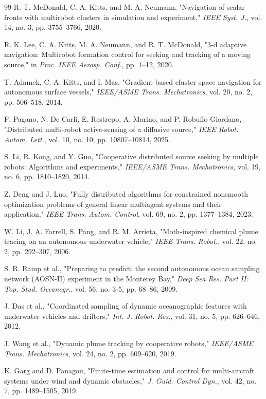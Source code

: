 \documentclass[lettersize,journal]{IEEEtran}
\begin{document}
\begin{thebibliography}{99}
 R. T. McDonald, C. A. Kitts, and M. A. Neumann, "Navigation of scalar fronts with multirobot clusters in simulation and experiment," \textit{IEEE Syst. J.}, vol. 14, no. 3, pp. 3755--3766, 2020.

 R. K. Lee, C. A. Kitts, M. A. Neumann, and R. T. McDonald, "3-d adaptive navigation: Multirobot formation control for seeking and tracking of a moving source," in \textit{Proc. IEEE Aerosp. Conf.}, pp. 1--12, 2020.

 T. Adamek, C. A. Kitts, and I. Mas, "Gradient-based cluster space navigation for autonomous surface vessels," \textit{IEEE/ASME Trans. Mechatronics}, vol. 20, no. 2, pp. 506--518, 2014.

 F. Pagano, N. De Carli, E. Restrepo, A. Marino, and P. Robuffo Giordano, "Distributed multi-robot active-sensing of a diffusive source," \textit{IEEE Robot. Autom. Lett.}, vol. 10, no. 10, pp. 10807--10814, 2025.

 S. Li, R. Kong, and Y. Guo, "Cooperative distributed source seeking by multiple robots: Algorithms and experiments," \textit{IEEE/ASME Trans. Mechatronics}, vol. 19, no. 6, pp. 1810--1820, 2014.

 Z. Deng and J. Luo, "Fully distributed algorithms for constrained nonsmooth optimization problems of general linear multiagent systems and their application," \textit{IEEE Trans. Autom. Control}, vol. 69, no. 2, pp. 1377--1384, 2023.

 W. Li, J. A. Farrell, S. Pang, and R. M. Arrieta, "Moth-inspired chemical plume tracing on an autonomous underwater vehicle," \textit{IEEE Trans. Robot.}, vol. 22, no. 2, pp. 292--307, 2006.

 S. R. Ramp et al., "Preparing to predict: the second autonomous ocean sampling network (AOSN-II) experiment in the Monterey Bay," \textit{Deep Sea Res. Part II: Top. Stud. Oceanogr.}, vol. 56, no. 3-5, pp. 68--86, 2009.

 J. Das et al., "Coordinated sampling of dynamic oceanographic features with underwater vehicles and drifters," \textit{Int. J. Robot. Res.}, vol. 31, no. 5, pp. 626--646, 2012.

 J. Wang et al., "Dynamic plume tracking by cooperative robots," \textit{IEEE/ASME Trans. Mechatronics}, vol. 24, no. 2, pp. 609--620, 2019.

 K. Garg and D. Panagou, "Finite-time estimation and control for multi-aircraft systems under wind and dynamic obstacles," \textit{J. Guid. Control Dyn.}, vol. 42, no. 7, pp. 1489--1505, 2019.


\end{thebibliography}
\end{document}
